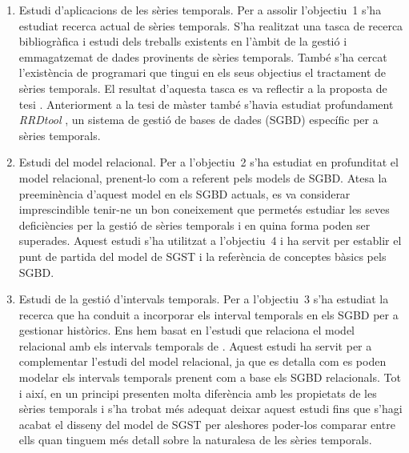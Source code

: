 


\begin{enumerate}

\item Estudi d'aplicacions de les sèries temporals. Per a assolir
  l'objectiu~1 s'ha estudiat recerca actual de sèries temporals.  S'ha
  realitzat una tasca de recerca bibliogràfica i estudi dels treballs
  existents en l'àmbit de la gestió i emmagatzemat de dades provinents
  de sèries temporals. També s'ha cercat l'existència de programari
  que tingui en els seus objectius el tractament de sèries
  temporals. El resultat d'aquesta tasca es va reflectir a la proposta
  de tesi \parencite{llusa12:ptd}. Anteriorment a la tesi de
  màster \parencite{llusa11:tfm} també s'havia estudiat profundament
  \emph{RRDtool} \parencite{rrdtool}, un sistema de gestió de bases de
  dades (SGBD) específic per a sèries temporals.


\item Estudi del model relacional. Per a l'objectiu~2 s'ha estudiat en
  profunditat el model relacional, prenent-lo com a referent pels
  models de SGBD. Atesa la preeminència d'aquest model en els SGBD
  actuals, es va considerar imprescindible tenir-ne un bon coneixement
  que permetés estudiar les seves deficiències per la gestió de sèries
  temporals i en quina forma poden ser superades. Aquest estudi s'ha
  utilitzat a l'objectiu~4 i ha servit per establir el punt de partida
  del model de SGST i la referència de conceptes bàsics pels SGBD.


\item Estudi de la gestió d'intervals temporals. Per a l'objectiu~3
  s'ha estudiat la recerca que ha conduit a incorporar els interval
  temporals en els SGBD per a gestionar històrics. Ens hem basat en
  l'estudi que relaciona el model relacional amb els intervals
  temporals de \textcite{date02:_tempor_data_relat_model}.  Aquest
  estudi ha servit per a complementar l'estudi del model relacional,
  ja que es detalla com es poden modelar els intervals temporals
  prenent com a base els SGBD relacionals. Tot i així, en un principi
  presenten molta diferència amb les propietats de les sèries
  temporals i s'ha trobat més adequat deixar aquest estudi fins que
  s'hagi acabat el disseny del model de SGST per aleshores poder-los
  comparar entre ells quan tinguem més detall sobre la naturalesa de
  les sèries temporals.




\end{enumerate}
